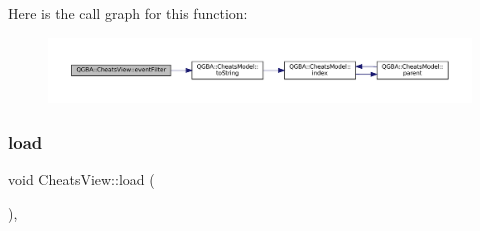 Here is the call graph for this function\+:
\nopagebreak
\begin{figure}[H]
\begin{center}
\leavevmode
\includegraphics[width=350pt]{class_q_g_b_a_1_1_cheats_view_a8fe7318a8e3e5e95e6555198cd94c8c1_cgraph}
\end{center}
\end{figure}
\mbox{\label{class_q_g_b_a_1_1_cheats_view_ab2f5f900e87c57c53acf74e9bddbf680}} 
\subsubsection{\texorpdfstring{load}{load}}
{\footnotesize\ttfamily void Cheats\+View\+::load (\begin{DoxyParamCaption}{ }\end{DoxyParamCaption})\hspace{0.3cm}{\ttfamily [private]}, {\ttfamily [slot]}}

